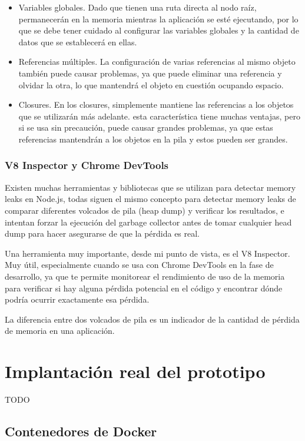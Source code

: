 \begin{itemize}
  \item Variables globales. Dado que tienen una ruta directa al nodo raíz, permanecerán en la memoria mientras la aplicación se esté ejecutando, por lo que se debe tener cuidado al configurar las variables globales y la cantidad de datos que se establecerá en ellas.
  \item Referencias múltiples. La configuración de varias referencias al mismo objeto también puede causar problemas, ya que puede eliminar una referencia y olvidar la otra, lo que mantendrá el objeto en cuestión ocupando espacio.
  \item Closures. En los closures, simplemente mantiene las referencias a los objetos que se utilizarán más adelante. esta característica tiene muchas ventajas, pero si se usa sin precaución, puede causar grandes problemas, ya que estas referencias mantendrán a los objetos en la pila y estos pueden ser grandes.
\end{itemize}

\subsubsection{V8 Inspector y Chrome DevTools}

Existen muchas herramientas y bibliotecas que se utilizan para detectar memory leaks en Node.js, todas siguen el mismo concepto para detectar memory leaks de comparar diferentes volcados de pila (heap dump) y verificar los resultados, e intentan forzar la ejecución del garbage collector antes de tomar cualquier head dump para hacer asegurarse de que la pérdida es real.

Una herramienta muy importante, desde mi punto de vista, es el V8 Inspector. Muy útil, especialmente cuando se usa con Chrome DevTools en la fase de desarrollo, ya que te permite monitorear el rendimiento de uso de la memoria para verificar si hay alguna pérdida potencial en el código y encontrar dónde podría ocurrir exactamente esa pérdida.

La diferencia entre dos volcados de pila es un indicador de la cantidad de pérdida de memoria en una aplicación.

\section{Implantación real del prototipo}

TODO

\subsection{Contenedores de Docker}

